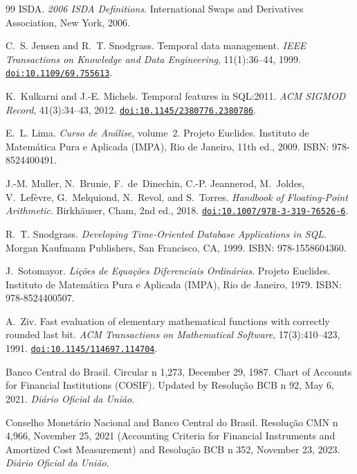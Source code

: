 \documentclass[11pt, a4paper]{article}
\newcommand{\doi}[1]{\href{https://doi.org/#1}{\texttt{doi:#1}}}
\theoremstyle{definition}
\theoremstyle{plain}
\theoremstyle{remark}
\begin{document}
\begin{thebibliography}{99}
ISDA.
\newblock \emph{2006 ISDA Definitions}.
\newblock International Swaps and Derivatives Association, New York, 2006.

C.~S. Jensen and R.~T. Snodgrass.
\newblock Temporal data management.
\newblock \emph{IEEE Transactions on Knowledge and Data Engineering}, 11(1):36--44, 1999.
\newblock \doi{10.1109/69.755613}.

K.~Kulkarni and J.-E. Michels.
\newblock Temporal features in {SQL:2011}.
\newblock \emph{ACM SIGMOD Record}, 41(3):34--43, 2012.
\newblock \doi{10.1145/2380776.2380786}.

E.~L. Lima.
\newblock \emph{Curso de An{\'a}lise}, volume~2.
\newblock Projeto Euclides. Instituto de Matem{\'a}tica Pura e Aplicada (IMPA), Rio de Janeiro, 11th ed., 2009.
\newblock ISBN: 978-8524400491.

J.-M. Muller, N.~Brunie, F.~de~Dinechin, C.-P. Jeannerod, M.~Joldes, V.~Lef{\`e}vre, G.~Melquiond, N.~Revol, and S.~Torres.
\newblock \emph{Handbook of Floating-Point Arithmetic}.
\newblock Birkh{\"a}user, Cham, 2nd ed., 2018.
\newblock \doi{10.1007/978-3-319-76526-6}.

R.~T. Snodgrass.
\newblock \emph{Developing Time-Oriented Database Applications in SQL}.
\newblock Morgan Kaufmann Publishers, San Francisco, CA, 1999.
\newblock ISBN: 978-1558604360.

J.~Sotomayor.
\newblock \emph{Li{\c{c}}{\~o}es de Equa{\c{c}}{\~o}es Diferenciais Ordin{\'a}rias}.
\newblock Projeto Euclides. Instituto de Matem{\'a}tica Pura e Aplicada (IMPA), Rio de Janeiro, 1979.
\newblock ISBN: 978-8524400507.

A.~Ziv.
\newblock Fast evaluation of elementary mathematical functions with correctly rounded last bit.
\newblock \emph{ACM Transactions on Mathematical Software}, 17(3):410--423, 1991.
\newblock \doi{10.1145/114697.114704}.

Banco Central do Brasil.
\newblock Circular n{\textordmasculine} 1,273, December 29, 1987. Chart of Accounts for Financial Institutions (COSIF).
\newblock Updated by Resolu{\c{c}}{\~a}o BCB n{\textordmasculine} 92, May 6, 2021. \emph{Di{\'a}rio Oficial da Uni{\~a}o}.

Conselho Monet{\'a}rio Nacional and Banco Central do Brasil.
\newblock Resolu{\c{c}}{\~a}o CMN n{\textordmasculine} 4,966, November 25, 2021 (Accounting Criteria for Financial Instruments and Amortized Cost Measurement) and Resolu{\c{c}}{\~a}o BCB n{\textordmasculine} 352, November 23, 2023. \emph{Di{\'a}rio Oficial da Uni{\~a}o}.


\end{thebibliography}
\end{document}
